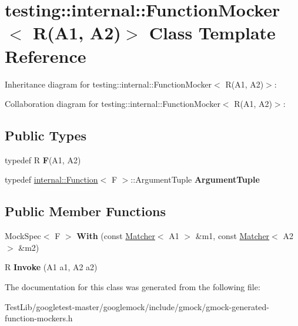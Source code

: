 \hypertarget{classtesting_1_1internal_1_1FunctionMocker_3_01R_07A1_00_01A2_08_4}{}\section{testing\+:\+:internal\+:\+:Function\+Mocker$<$ R(A1, A2)$>$ Class Template Reference}
\label{classtesting_1_1internal_1_1FunctionMocker_3_01R_07A1_00_01A2_08_4}


Inheritance diagram for testing\+:\+:internal\+:\+:Function\+Mocker$<$ R(A1, A2)$>$\+:


Collaboration diagram for testing\+:\+:internal\+:\+:Function\+Mocker$<$ R(A1, A2)$>$\+:
\subsection*{Public Types}
\begin{DoxyCompactItemize}
\item 
\mbox{\label{classtesting_1_1internal_1_1FunctionMocker_3_01R_07A1_00_01A2_08_4_a61302610bfc9b30588ea345e468310b2}} 
typedef R {\bfseries F}(A1, A2)
\item 
\mbox{\label{classtesting_1_1internal_1_1FunctionMocker_3_01R_07A1_00_01A2_08_4_ae75e3ba40a99224f7363681914212c19}} 
typedef \hyperlink{structtesting_1_1internal_1_1Function}{internal\+::\+Function}$<$ F $>$\+::Argument\+Tuple {\bfseries Argument\+Tuple}
\end{DoxyCompactItemize}
\subsection*{Public Member Functions}
\begin{DoxyCompactItemize}
\item 
\mbox{\label{classtesting_1_1internal_1_1FunctionMocker_3_01R_07A1_00_01A2_08_4_a719a26a1389c51c175909d34175a9f0e}} 
Mock\+Spec$<$ F $>$ {\bfseries With} (const \hyperlink{classtesting_1_1Matcher}{Matcher}$<$ A1 $>$ \&m1, const \hyperlink{classtesting_1_1Matcher}{Matcher}$<$ A2 $>$ \&m2)
\item 
\mbox{\label{classtesting_1_1internal_1_1FunctionMocker_3_01R_07A1_00_01A2_08_4_a518f5ac78887c64580343554aaae8f44}} 
R {\bfseries Invoke} (A1 a1, A2 a2)
\end{DoxyCompactItemize}


The documentation for this class was generated from the following file\+:\begin{DoxyCompactItemize}
\item 
Test\+Lib/googletest-\/master/googlemock/include/gmock/gmock-\/generated-\/function-\/mockers.\+h\end{DoxyCompactItemize}
